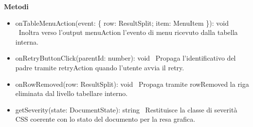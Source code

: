\documentclass[a4paper,11pt]{article}
\begin{document}
\textbf{Metodi}

\begin{itemize}
\item onTableMenuAction(event: \{ row: ResultSplit; item: MenuItem \}): void \
Inoltra verso l'output menuAction l'evento di menu ricevuto dalla tabella interna.

\item onRetryButtonClick(parentId: number): void \
Propaga l'identificativo del padre tramite retryAction quando l'utente avvia il retry.

\item onRowRemoved(row: ResultSplit): void \
Propaga tramite rowRemoved la riga eliminata dal livello tabellare interno.

\item getSeverity(state: DocumentState): string \
Restituisce la classe di severità CSS coerente con lo stato del documento per la resa grafica.
\end{itemize}
\end{document}

